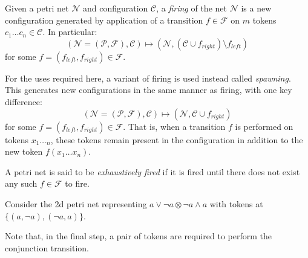     \begin{definition*}
        Given a petri net $\mathcal{N}$ and configuration $\mathcal{C}$, a \textit{firing} of the net $\mathcal{N}$ is a new configuration generated by application of a transition $f \in \mathcal{F}$ on $m$ tokens $c_1 \ldots c_n \in \mathcal{C}$.
        In particular:
        \begin{equation*}
            (\mathcal{N = (P, F), C}) \mapsto (\mathcal{N}, (\mathcal{C} \cup f_{right}) \setminus f_{left})
        \end{equation*}
        for some $f = (f_{left}, f_{right}) \in \mathcal{F}$.
        
        For the uses required here, a variant of firing is used instead called \textit{spawning}.
        This generates new configurations in the same manner as firing, with one key difference:
        \begin{equation*}
            (\mathcal{N = (P, F), C}) \mapsto (\mathcal{N}, \mathcal{C} \cup f_{right})
        \end{equation*}
        for some $f = (f_{left}, f_{right}) \in \mathcal{F}$.
        That is, when a transition $f$ is performed on tokens $x_1 \ldots _n$, these tokens remain present in the configuration in addition to the new token $f(x_1 \ldots x_n)$.
        
        A petri net is said to be \textit{exhaustively fired} if it is fired until there does not exist any such $f \in \mathcal{F}$ to fire.
    \end{definition*}

    \begin{example*}
        Consider the 2d petri net representing $a \vee \neg a \otimes \neg a \wedge a$ with tokens at $\{(a, \neg a), (\neg a, a)\}$.
        
        Note that, in the final step, a pair of tokens are required to perform the conjunction transition.
    \end{example*}



